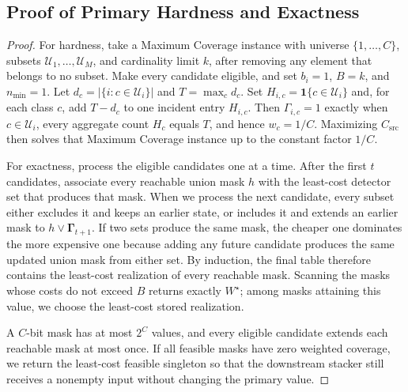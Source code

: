 \documentclass[conference]{IEEEtran}
\theoremstyle{definition}
\begin{document}
\subsection{Proof of Primary Hardness and Exactness}
\label{app:proof_primary}
\begin{proof}
For hardness, take a Maximum Coverage instance with universe $\{1,\ldots,C\}$, subsets $\mathcal U_1,\ldots,\mathcal U_M$, and cardinality limit $k$, after removing any element that belongs to no subset. Make every candidate eligible, and set $b_i=1$, $B=k$, and $n_{\min}=1$. Let $d_c=|\{i:c\in\mathcal U_i\}|$ and $T=\max_c d_c$. Set $H_{i,c}=\mathbf 1\{c\in\mathcal U_i\}$ and, for each class $c$, add $T-d_c$ to one incident entry $H_{i,c}$. Then $\Gamma_{i,c}=1$ exactly when $c\in\mathcal U_i$, every aggregate count $H_c$ equals $T$, and hence $w_c=1/C$.
Maximizing $C_{\mathrm{src}}$ then solves that Maximum Coverage instance up to the constant factor $1/C$.

For exactness, process the eligible candidates one at a time.
After the first $t$ candidates, associate every reachable union mask $h$ with the least-cost detector set that produces that mask.
When we process the next candidate, every subset either excludes it and keeps an earlier state, or includes it and extends an earlier mask to $h\vee\boldsymbol\Gamma_{t+1}$.
If two sets produce the same mask, the cheaper one dominates the more expensive one because adding any future candidate produces the same updated union mask from either set.
By induction, the final table therefore contains the least-cost realization of every reachable mask.
Scanning the masks whose costs do not exceed $B$ returns exactly $W^\star$; among masks attaining this value, we choose the least-cost stored realization.

A $C$-bit mask has at most $2^C$ values, and every eligible candidate extends each reachable mask at most once.
If all feasible masks have zero weighted coverage, we return the least-cost feasible singleton so that the downstream stacker still receives a nonempty input without changing the primary value.
\end{proof}
\end{document}
